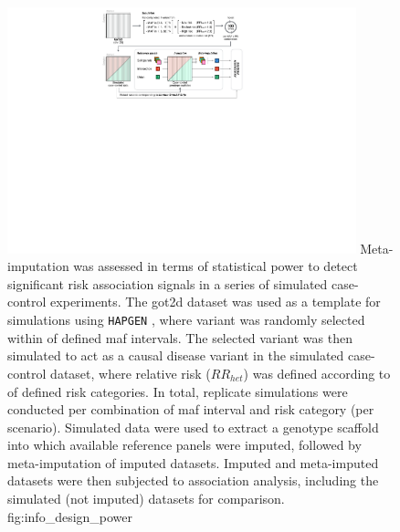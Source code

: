 

\begin{figure}[!htb]
\centering
\includegraphics[width=0.9\textwidth]{./img/ch2/info_design_power}
{Meta-imputation was assessed in terms of statistical power to detect significant risk association signals in a series of simulated case-control experiments.
The \gls{got2d} dataset was used as a template for simulations using \texttt{HAPGEN} \citep{Su:2011km}, where  variant was randomly selected within  of  defined \gls{maf} intervals.
The selected variant was then simulated to act as a causal disease variant in the simulated case-control dataset, where relative risk ($RR_{het}$) was defined according to  of  defined risk categories.
In total,  replicate simulations were conducted per combination of \gls{maf} interval and risk category (per scenario).
Simulated data were used to extract a genotype scaffold into which available reference panels were imputed, followed by meta-imputation of imputed datasets.
Imputed and meta-imputed datasets were then subjected to association analysis, including the simulated (not imputed) datasets for comparison.}
{fig:info_design_power}
\end{figure}
